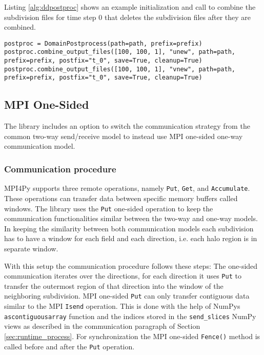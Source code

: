 Listing \ref{alg:ddpostproc} shows an example initialization and call to combine the subdivision files for time step 0 that deletes the subdivision files after they are combined.

\begin{lstlisting}[caption={Example post-processing.}, captionpos=b, label={alg:ddpostproc}, float, floatplacement=H]
postproc = DomainPostprocess(path=path, prefix=prefix)
postproc.combine_output_files([100, 100, 1], "unew", path=path, prefix=prefix, postfix="t_0", save=True, cleanup=True)
postproc.combine_output_files([100, 100, 1], "vnew", path=path, prefix=prefix, postfix="t_0", save=True, cleanup=True)
\end{lstlisting}

\newpage
\subsection{MPI One-Sided}
\label{sec:onesided}
The library includes an option to switch the communication strategy from the common two-way send/receive model to instead use MPI one-sided one-way communication model.

\subsubsection{Communication procedure}
MPI4Py supports three remote operations, namely \texttt{Put}, \texttt{Get}, and \texttt{Accumulate}.
These operations can transfer data between specific memory buffers called windows.
The library uses the \texttt{Put} one-sided operation to keep the communication functionalities similar between the two-way and one-way models.
In keeping the similarity between both communication models each subdivision has to have a window for each field and each direction, i.e. each halo region is in separate window.

With this setup the communication procedure follows these steps: 
The one-sided communication iterates over the directions, for each direction it uses \texttt{Put} to transfer the outermost region of that direction into the window of the neighboring subdivision.
MPI one-sided \texttt{Put} can only transfer contiguous data similar to the MPI \texttt{Isend} operation.
This is done with the help of NumPys \texttt{ascontiguousarray} function and the indices stored in the \texttt{send\_slices} NumPy views as described in the communication paragraph of Section \ref{sec:runtime_process}.
For synchronization the MPI one-sided \texttt{Fence()} method is called before and after the \texttt{Put} operation.

